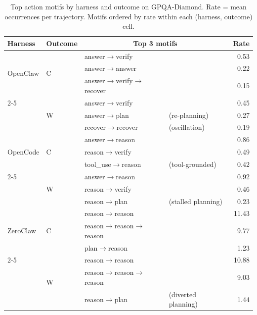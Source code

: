 \begin{table}[t]
\centering
\small
\caption{%
  Top action motifs by harness and outcome on GPQA-Diamond.
  Rate = mean occurrences per trajectory.
  Motifs ordered by rate within each (harness, outcome) cell.
}
\label{tab:gpqa-action-motifs}
\setlength{\tabcolsep}{3pt}
\begin{tabular}{llllr}
\toprule
Harness & Outcome & \multicolumn{2}{c}{Top 3 motifs} & Rate \\
\midrule
\multirow{3}{*}{OpenClaw}
  & \multirow{3}{*}{C}
    & answer$\to$verify            & & 0.53 \\
  & & answer$\to$answer            & & 0.22 \\
  & & answer$\to$verify$\to$recover &  & 0.15 \\
\cmidrule{2-5}
  & \multirow{3}{*}{W}
    & answer$\to$verify            & & 0.45 \\
  & & answer$\to$plan              & (re-planning) & 0.27 \\
  & & recover$\to$recover          & (oscillation) & 0.19 \\
\midrule
\multirow{3}{*}{OpenCode}
  & \multirow{3}{*}{C}
    & answer$\to$reason            & & 0.86 \\
  & & reason$\to$verify            & & 0.49 \\
  & & tool\_use$\to$reason         & (tool-grounded) & 0.42 \\
\cmidrule{2-5}
  & \multirow{3}{*}{W}
    & answer$\to$reason            & & 0.92 \\
  & & reason$\to$verify            & & 0.46 \\
  & & reason$\to$plan              & (stalled planning) & 0.23 \\
\midrule
\multirow{3}{*}{ZeroClaw}
  & \multirow{3}{*}{C}
    & reason$\to$reason            & & 11.43 \\
  & & reason$\to$reason$\to$reason & & 9.77 \\
  & & plan$\to$reason              & & 1.23 \\
\cmidrule{2-5}
  & \multirow{3}{*}{W}
    & reason$\to$reason            & & 10.88 \\
  & & reason$\to$reason$\to$reason & & 9.03 \\
  & & reason$\to$plan              & (diverted planning) & 1.44 \\
\bottomrule
\end{tabular}
\end{table}


